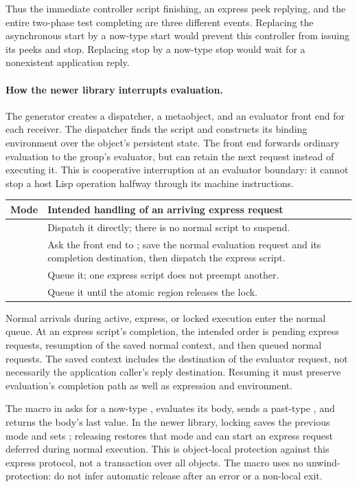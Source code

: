 Thus the immediate controller script finishing, an express peek replying,
and the entire two-phase test completing are three different events.
Replacing the asynchronous start by a now-type start would prevent this
controller from issuing its peeks and stop. Replacing stop by a now-type
stop would wait for a nonexistent application reply.

\paragraph{How the newer library interrupts evaluation.}
The generator creates a dispatcher, a metaobject, and an evaluator front
end for each receiver. The dispatcher finds the script and constructs
its binding environment over the object's persistent state. The front
end forwards ordinary evaluation to the group's evaluator, but can
retain the next \code{[:do . Context]} request instead of executing it.
This is cooperative interruption at an evaluator boundary: it cannot
stop a host Lisp operation halfway through its machine instructions.

\begin{longtable}{L{0.18\textwidth}L{0.72\textwidth}}
\textbf{Mode} & \textbf{Intended handling of an arriving express request}\\\hline
\endhead
{} & Dispatch it directly; there is no normal script to suspend.\\
 & Ask the front end to ; save the normal
evaluation request and its completion destination, then dispatch the express script.\\
 & Queue it; one express script does not preempt another.\\
 & Queue it until the atomic region releases the lock.\\
\end{longtable}

Normal arrivals during active, express, or locked execution enter the
normal queue. At an express script's completion, the intended order is
pending express requests, resumption of the saved normal context, and
then queued normal requests. The saved context includes the destination
 of the evaluator request, not necessarily the application
caller's reply destination. Resuming it must preserve evaluation's
completion path as well as expression and environment.

The  macro in  asks \code{[meta Me]}
for a now-type , evaluates its body, sends a past-type
, and returns the body's last value. In the newer library,
locking saves the previous mode and sets ; releasing restores
that mode and can start an express request deferred during normal
execution. This is object-local protection against this express protocol,
not a transaction over all objects. The macro uses no unwind-protection:
do not infer automatic release after an error or a non-local exit.

